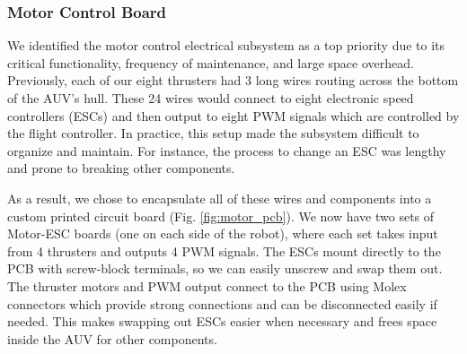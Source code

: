 \documentclass[conference]{IEEEtran}
\begin{document}
\subsubsection{Motor Control Board}
\label{sssec:motor_board}
We identified the motor control electrical subsystem as a top priority due to its critical functionality, frequency of maintenance, and large space overhead. Previously, each of our eight thrusters had 3 long wires routing across the bottom of the AUV's hull. These 24 wires would connect to eight electronic speed controllers (ESCs) and then output to eight PWM signals which are controlled by the flight controller. In practice, this setup made the subsystem difficult to organize and maintain. For instance, the process to change an ESC was lengthy and prone to breaking other components. 

As a result, we chose to encapsulate all of these wires and components into a custom printed circuit board (Fig. \ref{fig:motor_pcb}). We now have two sets of Motor-ESC boards (one on each side of the robot), where each set takes input from 4 thrusters and outputs 4 PWM signals. The ESCs mount directly to the PCB with screw-block terminals, so we can easily unscrew and swap them out. The thruster motors and PWM output connect to the PCB using Molex connectors which provide strong connections and can be disconnected easily if needed. This makes swapping out ESCs easier when necessary and frees space inside the AUV for other components.
\end{document}
